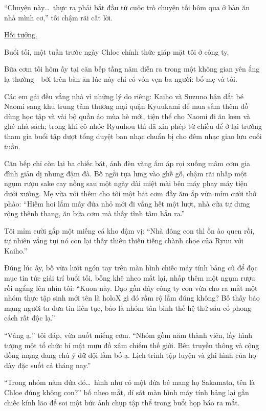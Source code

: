 \documentclass[../main.tex]{subfiles}
\begin{document}
``Chuyện này\dots\ thực ra phải bắt đầu từ cuộc trò chuyện tối hôm qua ở bàn ăn nhà mình cơ,'' tôi chậm rãi cất lời.

\begin{center}
    \uline{Hồi tưởng.}
\end{center}

Buổi tối, một tuần trước ngày Chloe chính thức giáp mặt tôi ở công ty.

Bữa cơm tối hôm ấy tại căn bếp tầng năm diễn ra trong một không gian yên ắng lạ thường—bởi trên bàn ăn lúc này chỉ có vỏn vẹn ba người: bố mẹ và tôi.

Các em gái đều vắng nhà vì những lý do riêng: Kaiho và Suzuno bận dắt bé Naomi sang khu trung tâm thương mại quận Kyuukami để mua sắm thêm đồ dùng học tập và vài bộ quần áo mùa hè mới, tiện thể cho Naomi đi ăn kem và ghé nhà sách; trong khi cô nhóc Ryuuhou thì đã xin phép từ chiều để ở lại trường tham gia buổi tập dượt tổng duyệt ban nhạc chuẩn bị cho đêm nhạc giao lưu cuối tuần.

Căn bếp chỉ còn lại ba chiếc bát, ánh đèn vàng ấm áp rọi xuống mâm cơm gia đình giản dị nhưng đậm đà. Bố ngồi tựa lưng vào ghế gỗ, chậm rãi nhấp một ngụm rượu sake cay nồng sau một ngày dài miệt mài bên máy phay máy tiện dưới xưởng. Mẹ vừa xới thêm cho tôi một bát cơm đầy ăm ắp vừa mỉm cười thở phào: ``Hiếm hoi lắm mấy đứa nhỏ mới đi vắng hết một lượt, nhà cửa tự dưng rộng thênh thang, ăn bữa cơm mà thấy tĩnh tâm hẳn ra.''

Tôi mỉm cười gắp một miếng cá kho đậm vị: ``Nhà đông con thì ồn ào quen rồi, tự nhiên vắng tụi nó con lại thấy thiêu thiếu tiếng chành chọe của Ryuu với Kaiho.''

Đúng lúc ấy, bố vừa lướt ngón tay trên màn hình chiếc máy tính bảng cũ để đọc mục tin tức giải trí buổi tối, bỗng khẽ nheo mắt lại, nhấp thêm một ngụm rượu rồi ngẩng lên nhìn tôi: ``Kuon này. Dạo gần đây công ty con vừa cho ra mắt một nhóm thực tập sinh mới tên là holoX gì đó rầm rộ lắm đúng không? Bố thấy báo mạng người ta đưa tin liên tục, bảo là nhóm tân binh thế hệ thứ sáu có phong cách rất độc lạ.''

``Vâng ạ,'' tôi đáp, vừa nuốt miếng cơm. ``Nhóm gồm năm thành viên, lấy hình tượng một tổ chức bí mật mưu đồ xâm chiếm thế giới. Bên truyền thông và cộng đồng mạng đang chú ý dữ dội lắm bố ạ. Lịch trình tập luyện và ghi hình của họ dày đặc suốt cả tháng nay.''

``Trong nhóm năm đứa đó\dots\ hình như có một đứa bé mang họ Sakamata, tên là Chloe đúng không con?'' bố nheo mắt, dí sát màn hình máy tính bảng lại gần chiếc kính lão để soi một bức ảnh chụp tập thể trong buổi họp báo ra mắt.
\end{document}
